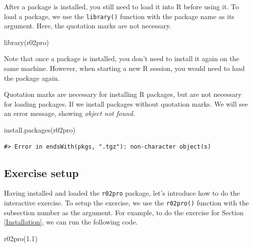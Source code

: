 \documentclass[
]{book}
\newenvironment{Shaded}{\begin{snugshade}}{\end{snugshade}}
\newcommand{\FloatTok}[1]{\textcolor[rgb]{0.00,0.00,0.81}{#1}}
\newcommand{\FunctionTok}[1]{\textcolor[rgb]{0.00,0.00,0.00}{#1}}
\newcommand{\NormalTok}[1]{#1}
\newenvironment{infobox}[1]
  {
  \begin{itemize}
  \renewcommand{\labelitemi}{
    \raisebox{-.7\height}[0pt][0pt]{
      {\setkeys{Gin}{width=3em,keepaspectratio}
        \texttt{[image: pics/\#1]}}
    }
  }
  \setlength{\fboxsep}{1em}
  \begin{blackbox}
  \item
  }
  {
  \end{blackbox}
  \end{itemize}
  }
\newenvironment{blackbox}{
  \definecolor{shadecolor}{rgb}{0, 0, 0}  %
  \color{white}
  \begin{shaded}}
 {\end{shaded}}
\begin{document}
After a package is installed, you still need to load it into R before using it. To load a package, we use the \texttt{library()} function with the package name as its argument. Here, the quotation marks are not necessary.

\begin{Shaded}
\begin{Highlighting}[]
\FunctionTok{library}\NormalTok{(r02pro)}
\end{Highlighting}
\end{Shaded}

Note that once a package is installed, you don't need to install it again on the same machine. However, when starting a new R session, you would need to load the package again.

\begin{infobox}{caution}
Quotation marks are necessary for installing R packages, but are not necessary for loading packages. If we install packages without quotation marks. We will see an error message, showing \emph{object not found}.

\end{infobox}

\begin{Shaded}
\begin{Highlighting}[]
\FunctionTok{install.packages}\NormalTok{(r02pro)}
\end{Highlighting}
\end{Shaded}

\begin{verbatim}
#> Error in endsWith(pkgs, ".tgz"): non-character object(s)
\end{verbatim}

\hypertarget{exercise-setup}{%
\subsection{Exercise setup}\label{exercise-setup}}

Having installed and loaded the \texttt{r02pro} package, let's introduce how to do the interactive exercise.
To setup the exercise, we use the \texttt{r02pro()} function with the subsection number as the argument. For example, to do the exercise for Section \ref{Installation}, we can run the following code.

\begin{Shaded}
\begin{Highlighting}[]
\FunctionTok{r02pro}\NormalTok{(}\FloatTok{1.1}\NormalTok{)}
\end{Highlighting}
\end{Shaded}
\end{document}
